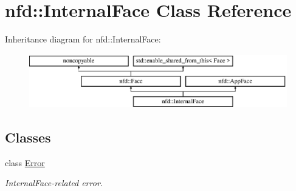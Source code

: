\hypertarget{classnfd_1_1InternalFace}{}\section{nfd\+:\+:Internal\+Face Class Reference}
\label{classnfd_1_1InternalFace}
Inheritance diagram for nfd\+:\+:Internal\+Face\+:\begin{figure}[H]
\begin{center}
\leavevmode
\includegraphics[height=2.362869cm]{classnfd_1_1InternalFace}
\end{center}
\end{figure}
\subsection*{Classes}
\begin{DoxyCompactItemize}
\item 
class \hyperlink{classnfd_1_1InternalFace_1_1Error}{Error}
\begin{DoxyCompactList}\small\item\em Internal\+Face-\/related error. \end{DoxyCompactList}\end{DoxyCompactItemize}
